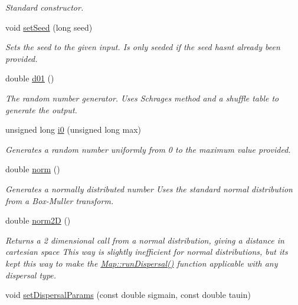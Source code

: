 \begin{DoxyCompactItemize}
\begin{DoxyCompactList}\small\item\em Standard constructor. \end{DoxyCompactList}\item 
void \hyperlink{class_n_rrand_a23325b4d35ee0b5b580726db05e2b8a3}{set\+Seed} (long seed)
\begin{DoxyCompactList}\small\item\em Sets the seed to the given input. Is only seeded if the seed hasn\textquotesingle{}t already been provided. \end{DoxyCompactList}\item 
double \hyperlink{class_n_rrand_a0043ba1c33b3dcb3b98210fb432f9f6c}{d01} ()
\begin{DoxyCompactList}\small\item\em The random number generator. Uses Schrage\textquotesingle{}s method and a shuffle table to generate the output. \end{DoxyCompactList}\item 
unsigned long \hyperlink{class_n_rrand_abb6db53dd1fdd9388b39e5dcd26c13ac}{i0} (unsigned long max)
\begin{DoxyCompactList}\small\item\em Generates a random number uniformly from 0 to the maximum value provided. \end{DoxyCompactList}\item 
double \hyperlink{class_n_rrand_aa57a6e9bae94c2df5a00473ba6fa900d}{norm} ()
\begin{DoxyCompactList}\small\item\em Generates a normally distributed number Uses the standard normal distribution from a Box-\/\+Muller transform. \end{DoxyCompactList}\item 
double \hyperlink{class_n_rrand_a754e5083299d12c1b33e8c66519d057e}{norm2D} ()
\begin{DoxyCompactList}\small\item\em Returns a 2 dimensional call from a normal distribution, giving a distance in cartesian space This way is slightly inefficient for normal distributions, but it\textquotesingle{}s kept this way to make the \hyperlink{class_map_a7c5b0623134a33511d7c17626c967176}{Map\+::run\+Dispersal()} function applicable with any dispersal type. \end{DoxyCompactList}\item 
void \hyperlink{class_n_rrand_a5679f458940de730f527772ca27db5ad}{set\+Dispersal\+Params} (const double sigmain, const double tauin)

\end{DoxyCompactItemize}
